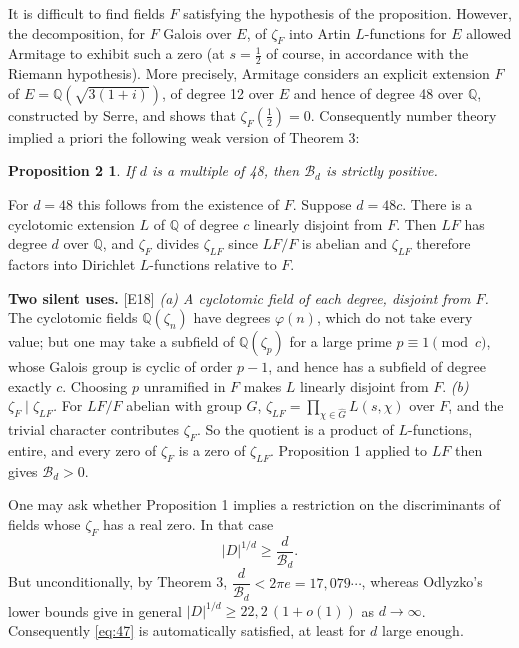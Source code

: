 \documentclass[11pt,reqno]{amsart}
\theoremstyle{plain}
\newtheorem*{propB}{Proposition 2}
\theoremstyle{definition}
\theoremstyle{remark}
\newcommand{\Q}{\mathbb{Q}}
\newcommand{\Bcal}{\mathcal{B}}
\newcommand{\Ledger}[1]{{\scriptsize\textsf{[#1]}}}
\begin{document}
It is difficult to find fields $F$ satisfying the hypothesis of the proposition.
However, the decomposition, for $F$ Galois over $E$, of $\zeta_F$ into Artin
$L$-functions for $E$ allowed Armitage to exhibit such a zero (at $s=\tfrac12$ of
course, in accordance with the Riemann hypothesis). More precisely, Armitage considers
an explicit extension $F$ of $E=\Q(\sqrt{3(1+i)})$, of degree 12 over $E$ and hence of
degree 48 over $\Q$, constructed by Serre, and shows that $\zeta_F(\tfrac12)=0$.
Consequently number theory implied a priori the following weak version of Theorem 3:

\begin{propB}
If $d$ is a multiple of 48, then $\Bcal_d$ is strictly positive.
\end{propB}

For $d=48$ this follows from the existence of $F$. Suppose $d=48c$. There is a
cyclotomic extension $L$ of $\Q$ of degree $c$ linearly disjoint from $F$. Then $LF$
has degree $d$ over $\Q$, and $\zeta_F$ divides $\zeta_{LF}$ since $LF/F$ is abelian
and $\zeta_{LF}$ therefore factors into Dirichlet $L$-functions relative to $F$.

\begin{expansion}
\textbf{Two silent uses.} \Ledger{E18}
\emph{(a) A cyclotomic field of each degree, disjoint from $F$.} The cyclotomic fields
$\Q(\zeta_n)$ have degrees $\varphi(n)$, which do not take every value; but one may
take a subfield of $\Q(\zeta_p)$ for a large prime $p\equiv1\pmod c$, whose Galois
group is cyclic of order $p-1$, and hence has a subfield of degree exactly $c$.
Choosing $p$ unramified in $F$ makes $L$ linearly disjoint from $F$.
\emph{(b) $\zeta_F\mid\zeta_{LF}$.} For $LF/F$ abelian with group $G$,
$\zeta_{LF}=\prod_{\chi\in\widehat G}L(s,\chi)$ over $F$, and the trivial character
contributes $\zeta_F$. So the quotient is a product of $L$-functions, entire, and
every zero of $\zeta_F$ is a zero of $\zeta_{LF}$. Proposition 1 applied to $LF$ then
gives $\Bcal_d>0$.
\end{expansion}

One may ask whether Proposition 1 implies a restriction on the discriminants of fields
whose $\zeta_F$ has a real zero. In that case
\begin{equation}\label{eq:47}
 |D|^{1/d}\ge\frac{d}{\Bcal_d} .
\end{equation}
But unconditionally, by Theorem 3, $\dfrac{d}{\Bcal_d}<2\pi e=17{,}079\cdots$,
whereas Odlyzko's lower bounds give in general $|D|^{1/d}\ge22{,}2\,(1+o(1))$ as
$d\to\infty$. Consequently \eqref{eq:47} is automatically satisfied, at least for $d$
large enough.
\end{document}
